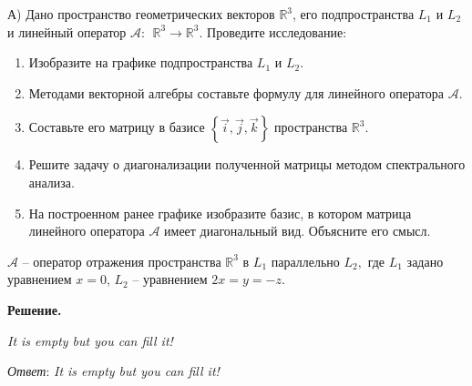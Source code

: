 А) Дано пространство геометрических векторов  $\mathbb{R}^3$, его подпространства  $L_1$  и  $L_2$  и линейный оператор  $\mathcal{A}:\ \ \mathbb{R}^3\rightarrow\mathbb{R}^3$.
Проведите исследование:
\begin{enumerate}
	\item Изобразите на графике подпространства  $L_1$  и  $L_2$.
	\item Методами векторной алгебры составьте формулу для линейного оператора  $\mathcal{A}$.
	\item Составьте его матрицу в базисе $\left\{\vec{i},\vec{j},\vec{k}\right\}$ пространства $\mathbb{R}^3$.
	\item Решите задачу о диагонализации полученной матрицы методом спектрального анализа.
	\item На построенном ранее графике изобразите базис, в котором матрица линейного оператора $\mathcal{A}$ имеет диагональный вид. Объясните его смысл.
\end{enumerate}

$\mathcal{A}$ – оператор отражения пространства  $\mathbb{R}^3$ в $L_1$ параллельно $L_2,$ где $L_1$ задано уравнением $x=0$, $L_2$ – уравнением  $2x=y=-z$.

\vspace{10mm}

\textbf{Решение.}

\textit{It is empty but you can fill it!}

\textit{Ответ}: \textit{It is empty but you can fill it!}
